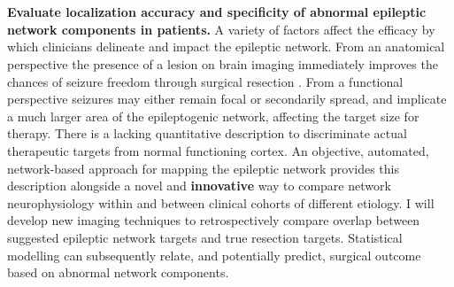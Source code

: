 ~\\
~\\
 \textbf{Evaluate localization accuracy and specificity of abnormal epileptic network components in patients.}
A variety of factors affect the efficacy by which clinicians delineate and impact the epileptic network. From an anatomical perspective the presence of a lesion on brain imaging immediately improves the chances of seizure freedom through surgical resection \cite{french2007refractory}. From a functional perspective seizures may either remain focal or secondarily spread, and implicate a much larger area of the epileptogenic network, affecting the target size for therapy. There is a lacking quantitative description to discriminate actual therapeutic targets from normal functioning cortex. An objective, automated, network-based approach for mapping the epileptic network provides this description alongside a novel and \textbf{innovative} way to compare network neurophysiology within and between clinical cohorts of different etiology. I will develop new imaging techniques to retrospectively compare overlap between suggested epileptic network targets and true resection targets. Statistical modelling can subsequently relate, and potentially predict, surgical outcome based on abnormal network components.

